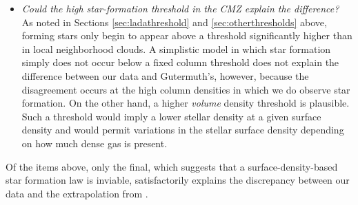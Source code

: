 \documentclass[twocolumn]{aastex61}
\begin{document}
\begin{itemize}
    \item \emph{Could the high star-formation threshold in the CMZ explain the
        difference?}
        As noted in Sections \ref{sec:ladathreshold} and
        \ref{sec:otherthresholds} above, forming stars only begin to appear
        above a threshold significantly higher than in local neighborhood
        clouds.  A simplistic model in which star formation simply does not
        occur below a fixed column threshold does not explain the difference
        between our data and Gutermuth's, however, because the disagreement
        occurs at the high column densities in which we do observe star
        formation.  On the other hand, a higher \emph{volume} density threshold
        is plausible.  Such a threshold would imply a lower stellar density at
        a given surface density and would  permit variations in the stellar
        surface density depending on how much dense gas is present.



\end{itemize}

Of the items above, only the final, which suggests that a surface-density-based
star formation law is inviable, satisfactorily explains the discrepancy between
our data and the extrapolation from \citet{Gutermuth2011a}.




\end{document}
